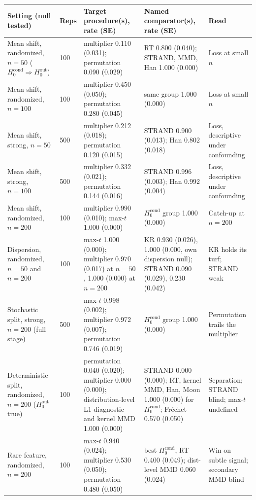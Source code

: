 \begin{table}[H]
\centering
\small
\setlength{\tabcolsep}{3.5pt}
\begin{tabular}{p{3.6cm}p{1.0cm}p{3.9cm}p{3.6cm}p{2.6cm}}
\toprule
Setting (null tested) & Reps & Target procedure(s), rate (SE) & Named comparator(s), rate (SE) & Read \\
\midrule
Mean shift, randomized, $n=50$ ($H_0^{\mathrm{cond}}\Rightarrow H_0^{\mathrm{out}}$) & 100 & multiplier 0.110 (0.031); permutation 0.090 (0.029) & RT 0.800 (0.040); STRAND, MMD, Han 1.000 (0.000) & Loss at small $n$ \\
Mean shift, randomized, $n=100$ & 100 & multiplier 0.450 (0.050); permutation 0.280 (0.045) & same group 1.000 (0.000) & Loss at small $n$ \\
Mean shift, strong, $n=50$ & 500 & multiplier 0.212 (0.018); permutation 0.120 (0.015) & STRAND 0.900 (0.013); Han 0.802 (0.018) & Loss, descriptive under confounding \\
Mean shift, strong, $n=100$ & 500 & multiplier 0.332 (0.021); permutation 0.144 (0.016) & STRAND 0.996 (0.003); Han 0.992 (0.004) & Loss, descriptive under confounding \\
Mean shift, randomized, $n=200$ & 100 & multiplier 0.990 (0.010); max-$t$ 1.000 (0.000) & $H_0^{\mathrm{cond}}$ group 1.000 (0.000) & Catch-up at $n=200$ \\
Dispersion, randomized, $n=50$ and $n=200$ & 100 & max-$t$ 1.000 (0.000); multiplier 0.970 (0.017) at $n=50$, 1.000 (0.000) at $n=200$ & KR 0.930 (0.026), 1.000 (0.000, own dispersion null); STRAND 0.090 (0.029), 0.230 (0.042) & KR holds its turf; STRAND weak \\
Stochastic split, strong, $n=200$ (full stage) & 500 & max-$t$ 0.998 (0.002); multiplier 0.972 (0.007); permutation 0.746 (0.019) & $H_0^{\mathrm{cond}}$ group 1.000 (0.000) & Permutation trails the multiplier \\
Deterministic split, randomized, $n=200$ ($H_0^{\mathrm{out}}$ true) & 100 & permutation 0.040 (0.020); multiplier 0.000 (0.000); distribution-level L1 diagnostic and kernel MMD 1.000 (0.000) & STRAND 0.000 (0.000); RT, kernel MMD, Han, Moon 1.000 (0.000) for $H_0^{\mathrm{cond}}$; Fr\'echet 0.570 (0.050) & Separation; STRAND blind; max-$t$ undefined \\
Rare feature, randomized, $n=200$ & 100 & max-$t$ 0.940 (0.024); multiplier 0.530 (0.050); permutation 0.480 (0.050) & best $H_0^{\mathrm{cond}}$, RT 0.400 (0.049); dist-level MMD 0.060 (0.024) & Win on subtle signal; secondary MMD blind \\

\end{tabular}
\end{table}

